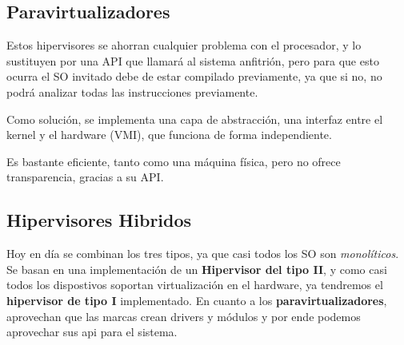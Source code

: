 \subsection{Paravirtualizadores}
\noindent Estos hipervisores se ahorran cualquier problema con el procesador, y lo sustituyen por una API que llamará al sistema anfitrión, pero para que esto ocurra el SO invitado debe de estar compilado previamente, ya que si no, no podrá analizar todas las instrucciones previamente.
\par\noindent Como solución, se implementa una capa de abstracción, una interfaz entre el kernel y el hardware (VMI), que funciona de forma independiente.
\par\noindent Es bastante eficiente, tanto como una máquina física, pero no ofrece transparencia, gracias a su API.
\subsection{Hipervisores Hibridos}
\noindent Hoy en día se combinan los tres tipos, ya que casi todos los SO son \textit{monolíticos}. Se basan en una implementación de un \textbf{Hipervisor del tipo II}, y como casi todos los dispostivos soportan virtualización en el hardware, ya tendremos el \textbf{hipervisor de tipo I} implementado. En cuanto a los \textbf{paravirtualizadores}, aprovechan que las marcas crean drivers y módulos y por ende podemos aprovechar sus api para el sistema.